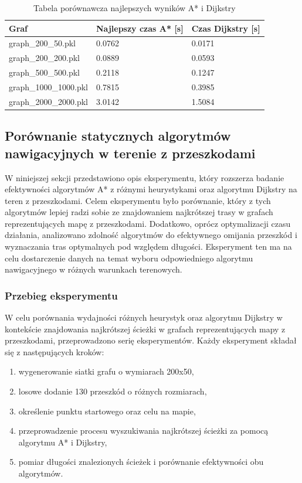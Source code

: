 \documentclass[12pt,twoside]{article}
\begin{document}
\begin{table}[ht]
\caption{Tabela porównawcza najlepszych wyników A* i Dijkstry}
\centering		
\begin{tabular}{|p{}|p{}|p{}|}	
\hline
Graf & Najlepszy czas A* [s] & Czas Dijkstry [s] \\
\hline
graph\_200\_50.pkl & 
0.0762 & 
0.0171 \\
graph\_200\_200.pkl & 
0.0889 & 
0.0593 \\
graph\_500\_500.pkl & 
0.2118 & 
0.1247 \\
graph\_1000\_1000.pkl & 
0.7815 & 
0.3985 \\
graph\_2000\_2000.pkl & 
3.0142 & 
1.5084 \\
\hline
\end{tabular}	

\label{Tab:comparison}
\end{table}

\clearpage

\subsection{Porównanie statycznych algorytmów nawigacyjnych w terenie z przeszkodami}

W niniejszej sekcji przedstawiono opis eksperymentu, który rozszerza badanie efektywności algorytmów A* z różnymi heurystykami oraz algorytmu Dijkstry na teren z przeszkodami. Celem eksperymentu było porównanie, który z tych algorytmów lepiej radzi sobie ze znajdowaniem najkrótszej trasy w grafach reprezentujących mapę z przeszkodami. Dodatkowo, oprócz optymalizacji czasu działania, analizowano zdolność algorytmów do efektywnego omijania przeszkód i wyznaczania tras optymalnych pod względem długości. Eksperyment ten ma na celu dostarczenie danych na temat wyboru odpowiedniego algorytmu nawigacyjnego w różnych warunkach terenowych.

\subsubsection{Przebieg eksperymentu}

W celu porównania wydajności różnych heurystyk oraz algorytmu Dijkstry w kontekście znajdowania najkrótszej ścieżki w grafach reprezentujących mapy z przeszkodami, przeprowadzono serię eksperymentów. Każdy eksperyment składał się z następujących kroków:

\begin{enumerate}[label=\alph*), leftmargin=1.25cm]
    \item wygenerowanie siatki grafu o wymiarach 200x50,
    \item losowe dodanie 130 przeszkód o różnych rozmiarach,
    \item określenie punktu startowego oraz celu na mapie,
    \item przeprowadzenie procesu wyszukiwania najkrótszej ścieżki za pomocą algorytmu A* i Dijkstry,
    \item pomiar długości znalezionych ścieżek i porównanie efektywności obu algorytmów.
\end{enumerate}
\end{document}
